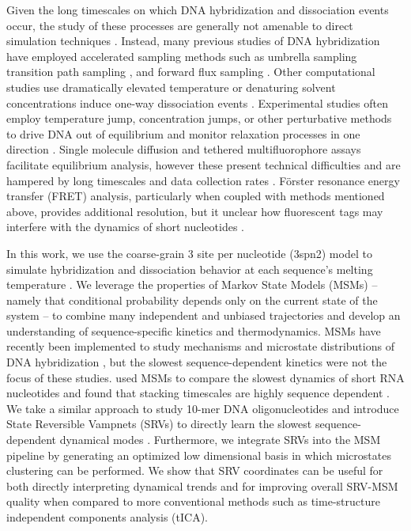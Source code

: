 \documentclass[journal=jpcbfk,manuscript=article]{achemso}
\begin{document}
Given the long timescales on which DNA hybridization and dissociation events occur, the study of these processes are generally not amenable to direct simulation techniques \citep{Phys2014}. Instead, many previous studies of DNA hybridization have employed accelerated sampling methods such as umbrella sampling \citep{Schmitt2013ExploringSurface} transition path sampling \citep{Sambriski2009}, and forward flux sampling \citep{Schmitt2013ExploringSurface, Sambriski2009,  Hoefert2011MolecularOligonucleotides, Romano2013DNADependence}. Other computational studies use dramatically elevated temperature or denaturing solvent concentrations induce one-way dissociation events \citep{Wong2008TheSimulations, Perez2010Real-timeUnfolding}. Experimental studies often employ temperature jump, concentration jumps, or other perturbative methods to drive DNA out of equilibrium and monitor relaxation processes in one direction \citep{Morrison1993SensitiveSolution, Wetmur1968KineticsDNA}. Single molecule diffusion and tethered multifluorophore assays facilitate equilibrium analysis, however these present technical difficulties and are hampered by long timescales and data collection rates \citep{Liu20173DSolution,  Schickinger2018TetheredHelices}. Förster resonance energy transfer (FRET) analysis, particularly when coupled with methods mentioned above, provides additional resolution, but it unclear how fluorescent tags may interfere with the dynamics of short nucleotides \citep{Morrison1993SensitiveSolution}.

In this work, we use the coarse-grain 3 site per nucleotide (3spn2) model to simulate hybridization and dissociation behavior at each sequence's melting temperature \citep{Hinckley2013AnHybridization}.  We leverage the properties of Markov State Models (MSMs) -- namely that conditional probability depends only on the current state of the system \citep{Pande2010EverythingAsk} -- to combine many independent and unbiased trajectories and develop an understanding of sequence-specific kinetics and thermodynamics. MSMs have recently been implemented to study mechanisms and microstate distributions of DNA hybridization  \citep{Jin2019, Xiao2019}, but the slowest sequence-dependent kinetics were not the focus of these studies. \citet{Pinamonti2017} used MSMs to compare the slowest dynamics of short RNA nucleotides and found that stacking timescales are highly sequence dependent \citep{Pinamonti2017}. We take a similar approach to study 10-mer DNA oligonucleotides and introduce State Reversible Vampnets (SRVs) to directly learn the slowest sequence-dependent dynamical modes \citep{Chen}. Furthermore, we integrate SRVs into the MSM pipeline by generating an optimized low dimensional basis in which microstates clustering can be performed. We show that SRV coordinates can be useful for both directly interpreting dynamical trends and for improving overall SRV-MSM quality when compared to more conventional methods such as time-structure independent components analysis (tICA).
\end{document}
